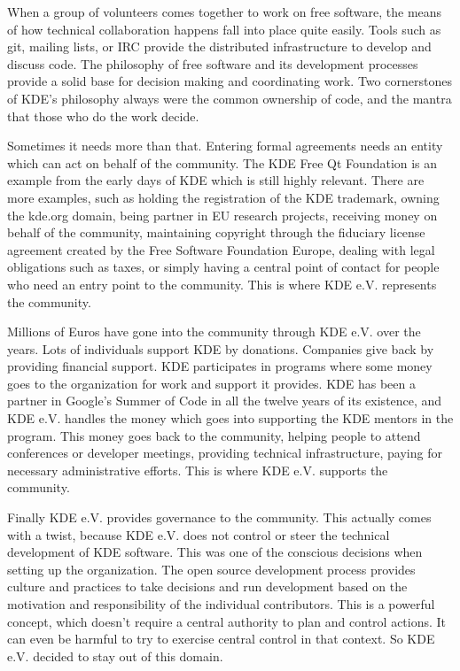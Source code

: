 When a group of volunteers comes together to work on free software, the means of how technical collaboration happens fall into place quite easily. Tools such as git, mailing lists, or IRC provide the distributed infrastructure to develop and discuss code. The philosophy of free software and its development processes provide a solid base for decision making and coordinating work. Two cornerstones of KDE's philosophy always were the common ownership of code, and the mantra that those who do the work decide.

Sometimes it needs more than that. Entering formal agreements needs an entity which can act on behalf of the community. The KDE Free Qt Foundation is an example from the early days of KDE which is still highly relevant. There are more examples, such as holding the registration of the KDE trademark, owning the kde.org domain, being partner in EU research projects, receiving money on behalf of the community, maintaining copyright through the fiduciary license agreement created by the Free Software Foundation Europe, dealing with legal obligations such as taxes, or simply having a central point of contact for people who need an entry point to the community. This is where KDE e.V. represents the community.

Millions of Euros have gone into the community through KDE e.V. over the years. Lots of individuals support KDE by donations. Companies give back by providing financial support. KDE participates in programs where some money goes to the organization for work and support it provides. KDE has been a partner in Google's Summer of Code in all the twelve years of its existence, and KDE e.V. handles the money which goes into supporting the KDE mentors in the program. This money goes back to the community, helping people to attend conferences or developer meetings, providing technical infrastructure, paying for necessary administrative efforts. This is where KDE e.V. supports the community.

Finally KDE e.V. provides governance to the community. This actually comes with a twist, because KDE e.V. does not control or steer the technical development of KDE software. This was one of the conscious decisions when setting up the organization. The open source development process provides culture and practices to take decisions and run development based on the motivation and responsibility of the individual contributors. This is a powerful concept, which doesn't require a central authority to plan and control actions. It can even be harmful to try to exercise central control in that context. So KDE e.V. decided to stay out of this domain.

